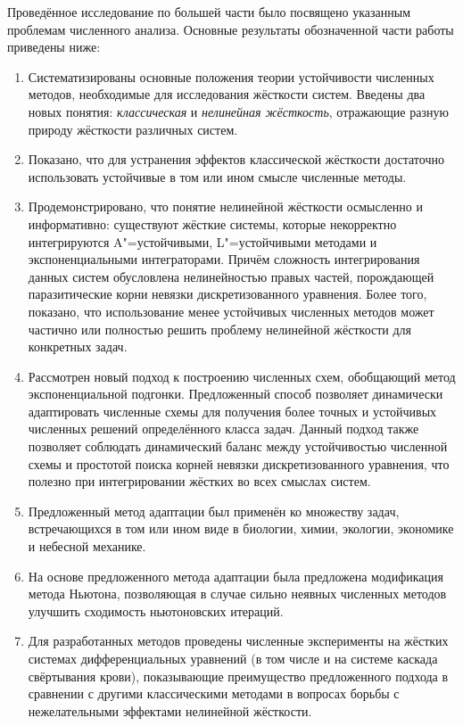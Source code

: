 Проведённое исследование по большей части было посвящено указанным проблемам численного анализа.
Основные результаты обозначенной части работы приведены ниже:
\begin{enumerate}
    \item
        Систематизированы основные положения теории устойчивости численных методов,
        необходимые для исследования жёсткости систем.
        Введены два новых понятия: \emph{классическая} и \emph{нелинейная жёсткость},
        отражающие разную природу жёсткости различных систем.
    \item
        Показано, что для устранения эффектов классической жёсткости достаточно использовать
        устойчивые в том или ином смысле численные методы.
    \item
        Продемонстрировано, что понятие нелинейной жёсткости осмысленно и информативно:
        существуют жёсткие системы, которые некорректно интегрируются A"=устойчивыми,
        L"=устойчивыми методами и экспоненциальными интеграторами.
        Причём сложность интегрирования данных систем обусловлена нелинейностью правых частей,
        порождающей паразитические корни невязки дискретизованного уравнения.
        Более того, показано, что использование менее устойчивых численных методов
        может частично или полностью решить проблему нелинейной жёсткости для конкретных задач.
    \item
        Рассмотрен новый подход к построению численных схем,
        обобщающий метод экспоненциальной подгонки.
        Предложенный способ позволяет динамически адаптировать численные схемы
        для получения более точных и устойчивых численных решений определённого класса задач.
        Данный подход также позволяет соблюдать динамический баланс между устойчивостью численной схемы
        и простотой поиска корней невязки дискретизованного уравнения,
        что полезно при интегрировании жёстких во всех смыслах систем.
    \item
        Предложенный метод адаптации был применён ко множеству задач,
        встречающихся в том или ином виде в биологии, химии, экологии, экономике и небесной механике.
    \item
        На основе предложенного метода адаптации была предложена модификация метода Ньютона,
        позволяющая в случае сильно неявных численных методов улучшить сходимость ньютоновских итераций.
    \item
        Для разработанных методов проведены численные эксперименты на жёстких системах
        дифференциальных уравнений (в том числе и на системе каскада свёртывания крови),
        показывающие преимущество предложенного подхода в сравнении с другими классическими методами
        в вопросах борьбы с нежелательными эффектами нелинейной жёсткости.
\end{enumerate}

